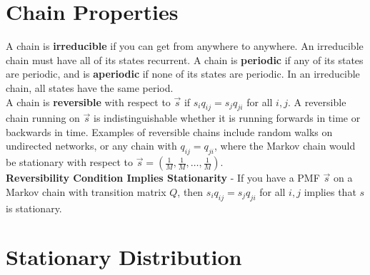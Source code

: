 \documentclass[11.5pt]{article}
\begin{document}
\begin{notes}
\section*{Chain Properties}
A chain is \textbf{irreducible} if you can get from anywhere to anywhere. An irreducible chain must have all of its states recurrent. A chain is \textbf{periodic} if any of its states are periodic, and is \textbf{aperiodic} if none of its states are periodic. In an irreducible chain, all states have the same period. \\

A chain is \textbf{reversible} with respect to $\vec{s}$ if $s_iq_{ij} = s_jq_{ji}$ for all $i, j$.  A reversible chain running on $\vec{s}$ is indistinguishable whether it is running forwards in time or backwards in time. Examples of reversible chains include random walks on undirected networks, or any chain with $q_{ij} = q_{ji}$, where the Markov chain would be stationary with respect to $\vec{s} = (\frac{1}{M}, \frac{1}{M}, \dots, \frac{1}{M})$. \\

\textbf{Reversibility Condition Implies Stationarity} - If you have a PMF $\vec{s}$ on a Markov chain with transition matrix $Q$, then $s_iq_{ij} = s_jq_{ji}$ for all $i, j$ implies that $s$ is stationary.


\section*{Stationary Distribution}


\end{notes}
\end{document}
